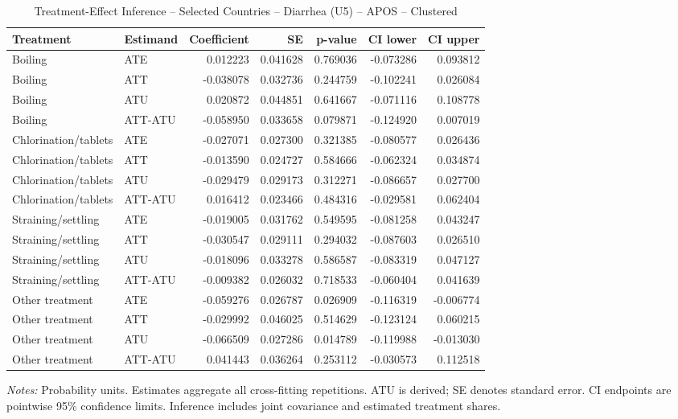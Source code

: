 \begin{table}[htbp]
\centering
\caption{Treatment-Effect Inference -- Selected Countries -- Diarrhea (U5) -- APOS -- Clustered}
\label{tab:inference-diarrhea-APOS-selected-countries}
\scriptsize
\begin{adjustbox}{max width=\linewidth}
\begin{tabular}{llrrrrr}
\toprule
Treatment & Estimand & Coefficient & SE & p-value & CI lower & CI upper \\
\midrule
Boiling & ATE & 0.012223 & 0.041628 & 0.769036 & -0.073286 & 0.093812 \\
Boiling & ATT & -0.038078 & 0.032736 & 0.244759 & -0.102241 & 0.026084 \\
Boiling & ATU & 0.020872 & 0.044851 & 0.641667 & -0.071116 & 0.108778 \\
Boiling & ATT-ATU & -0.058950 & 0.033658 & 0.079871 & -0.124920 & 0.007019 \\
Chlorination/tablets & ATE & -0.027071 & 0.027300 & 0.321385 & -0.080577 & 0.026436 \\
Chlorination/tablets & ATT & -0.013590 & 0.024727 & 0.584666 & -0.062324 & 0.034874 \\
Chlorination/tablets & ATU & -0.029479 & 0.029173 & 0.312271 & -0.086657 & 0.027700 \\
Chlorination/tablets & ATT-ATU & 0.016412 & 0.023466 & 0.484316 & -0.029581 & 0.062404 \\
Straining/settling & ATE & -0.019005 & 0.031762 & 0.549595 & -0.081258 & 0.043247 \\
Straining/settling & ATT & -0.030547 & 0.029111 & 0.294032 & -0.087603 & 0.026510 \\
Straining/settling & ATU & -0.018096 & 0.033278 & 0.586587 & -0.083319 & 0.047127 \\
Straining/settling & ATT-ATU & -0.009382 & 0.026032 & 0.718533 & -0.060404 & 0.041639 \\
Other treatment & ATE & -0.059276 & 0.026787 & 0.026909 & -0.116319 & -0.006774 \\
Other treatment & ATT & -0.029992 & 0.046025 & 0.514629 & -0.123124 & 0.060215 \\
Other treatment & ATU & -0.066509 & 0.027286 & 0.014789 & -0.119988 & -0.013030 \\
Other treatment & ATT-ATU & 0.041443 & 0.036264 & 0.253112 & -0.030573 & 0.112518 \\
\bottomrule
\end{tabular}

\end{adjustbox}
\par\smallskip
\begin{minipage}{\linewidth}\scriptsize \textit{Notes:} Probability units. Estimates aggregate all cross-fitting repetitions. ATU is derived; SE denotes standard error. CI endpoints are pointwise 95\% confidence limits. Inference includes joint covariance and estimated treatment shares. \end{minipage}
\end{table}

